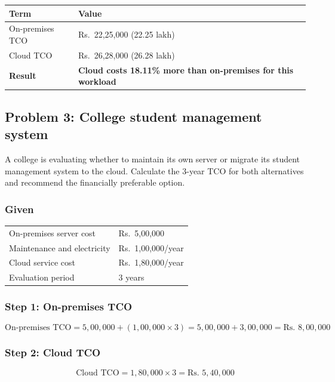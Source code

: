 \documentclass[11pt,a4paper]{article}
\begin{document}
\begin{tabularx}{\textwidth}{@{}lX@{}}
\toprule
\rowcolor{tablehead}\textbf{Term} & \textbf{Value} \\
\midrule
On-premises TCO & Rs.\ 22,25,000 (22.25 lakh) \\
Cloud TCO & Rs.\ 26,28,000 (26.28 lakh) \\
\textbf{Result} & \textbf{Cloud costs 18.11\% more than on-premises for this workload} \\
\bottomrule
\end{tabularx}

\subsection*{Problem 3: College student management system}

A college is evaluating whether to maintain its own server or migrate its student management
system to the cloud. Calculate the 3-year TCO for both alternatives and recommend the
financially preferable option.

\subsubsection*{Given}

\begin{tabularx}{\textwidth}{@{}lX@{}}
On-premises server cost & Rs.\ 5,00,000 \\
Maintenance and electricity & Rs.\ 1,00,000/year \\
Cloud service cost & Rs.\ 1,80,000/year \\
Evaluation period & 3 years \\
\end{tabularx}

\subsubsection*{Step 1: On-premises TCO}

\[
\text{On-premises TCO} = 5{,}00{,}000 + (1{,}00{,}000 \times 3) = 5{,}00{,}000 + 3{,}00{,}000
= \text{Rs. } 8{,}00{,}000
\]

\subsubsection*{Step 2: Cloud TCO}

\[
\text{Cloud TCO} = 1{,}80{,}000 \times 3 = \text{Rs. } 5{,}40{,}000
\]
\end{document}
